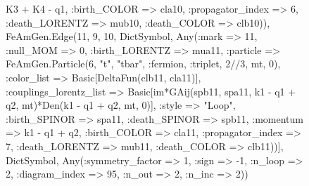 \documentclass{revtex4}
\begin{document}
\begin{figure}[!htb]
\begin{center}
{K3 + K4 - q1, :birth_COLOR => cla10, :propagator_index => 6, :death_LORENTZ => mub10, :death_COLOR => clb10)), FeAmGen.Edge(11, 9, 10, Dict{Symbol, Any}(:mark => 11, :null_MOM => 0, :birth_LORENTZ => mua11, :particle => FeAmGen.Particle(6, "t", "tbar", :fermion, :triplet, 2//3, mt, 0), :color_list => Basic[DeltaFun(clb11, cla11)], :couplings_lorentz_list => Basic[im*GAij(spb11, spa11, k1 - q1 + q2, mt)*Den(k1 - q1 + q2, mt, 0)], :style => "Loop", :birth_SPINOR => spa11, :death_SPINOR => spb11, :momentum => k1 - q1 + q2, :birth_COLOR => cla11, :propagator_index => 7, :death_LORENTZ => mub11, :death_COLOR => clb11))], Dict{Symbol, Any}(:symmetry_factor => 1, :sign => -1, :n_loop => 2, :diagram_index => 95, :n_out => 2, :n_inc => 2)) 
}
\end{center}
\end{figure}
\end{document}

